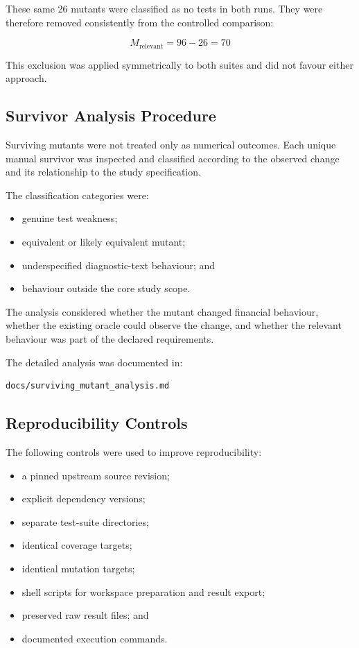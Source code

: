\documentclass[12pt]{article}
\begin{document}
These same 26 mutants were classified as no tests in both runs. They were
therefore removed consistently from the controlled comparison:

\begin{equation}
M_{\text{relevant}} = 96 - 26 = 70
\end{equation}

This exclusion was applied symmetrically to both suites and did not favour
either approach.

\subsection{Survivor Analysis Procedure}

Surviving mutants were not treated only as numerical outcomes. Each unique
manual survivor was inspected and classified according to the observed change
and its relationship to the study specification.

The classification categories were:

\begin{itemize}
    \item genuine test weakness;
    \item equivalent or likely equivalent mutant;
    \item underspecified diagnostic-text behaviour; and
    \item behaviour outside the core study scope.
\end{itemize}

The analysis considered whether the mutant changed financial behaviour,
whether the existing oracle could observe the change, and whether the relevant
behaviour was part of the declared requirements.

The detailed analysis was documented in:

\begin{verbatim}
docs/surviving_mutant_analysis.md
\end{verbatim}

\subsection{Reproducibility Controls}

The following controls were used to improve reproducibility:

\begin{itemize}
    \item a pinned upstream source revision;
    \item explicit dependency versions;
    \item separate test-suite directories;
    \item identical coverage targets;
    \item identical mutation targets;
    \item shell scripts for workspace preparation and result export;
    \item preserved raw result files; and
    \item documented execution commands.
\end{itemize}
\end{document}
